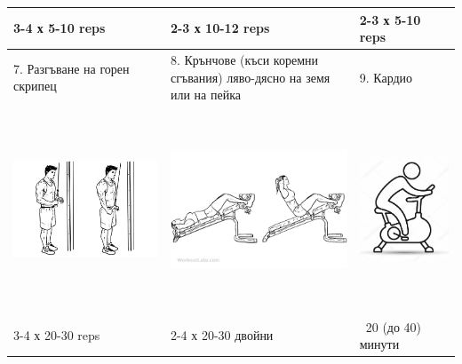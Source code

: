 \documentclass{article}
\begin{document}
\begin{tabular}{ | m{5cm} | m{5cm} | m{5cm} | }
3-4 х 5-10 reps &  2-3 х 10-12 reps & 2-3 х 5-10 reps \\ 
\hline
7. Разгъване на горен скрипец & 
8. Крънчове (къси коремни сгъвания) ляво-дясно на земя или на пейка& 
9. Кардио \\ 
\begin{minipage}{5cm} \includegraphics[width=\linewidth, height=60mm]{day_B_ex_7_Standing-Cable-Pushdown.jpg} \end{minipage} &
\begin{minipage}{5cm} \includegraphics[width=\linewidth, height=60mm]{day_B_ex_8_Decline_Bench_Crunches_Sit-ups_Situps-1.png} \end{minipage} & 
\begin{minipage}{5cm} \includegraphics[width=\linewidth, height=60mm]{day_B_ex_9_cardio.jpg} \end{minipage} \\
3-4 х 20-30 reps &  2-4 х 20-30 двойни & ~20 (до 40) минути \\ 
\hline
\end{tabular}
\end{document}
